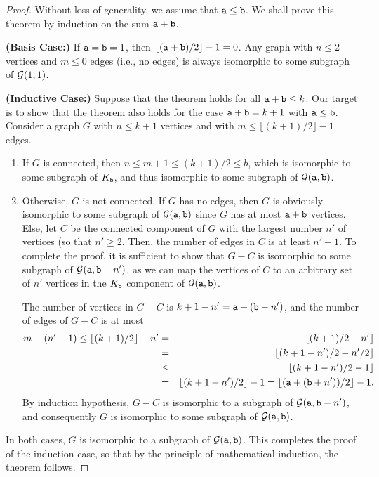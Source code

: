 \begin{proof}
Without loss of generality, we assume that $\mathtt{a} \leq \mathtt{b}$.  We shall prove this theorem by induction on the sum $\mathtt{a} + \mathtt{b}$. 

\medskip

\noindent
{\bf (Basis Case:)} If $\mathtt{a} = \mathtt{b} =1$, then $\lfloor (\mathtt{a}+\mathtt{b})/2 \rfloor-1 = 0$. Any graph with $n \leq 2$ vertices and $m \leq 0$ edges (i.e., no edges) is always isomorphic to some subgraph of ${\cal G}(1,1)$.

\medskip

\noindent
{\bf (Inductive Case:)} Suppose that the theorem holds for all $\mathtt{a} + \mathtt{b} \leq k$.  Our target is to show that the theorem also holds for the case $\mathtt{a} + \mathtt{b} = k + 1$ with $\mathtt{a} \leq \mathtt{b}$.   Consider a graph $G$ with  $n \leq k+1$ vertices and with $m \leq \lfloor (k+1)/2 \rfloor -1$ edges. 

\begin{enumerate}
  \item If $G$ is connected, then $n \leq m + 1 \leq (k+1)/2 \leq b$, which is isomorphic to some subgraph of $K_{\mathtt{b}}$, 
           and thus isomorphic to some subgraph of ${\cal G}(\mathtt{a},\mathtt{b})$.   

  \item Otherwise, $G$ is not connected.  
           If $G$ has no edges, then $G$ is obviously isomorphic to some subgraph of ${\cal G}(\mathtt{a},\mathtt{b})$ 
           since $G$ has at most $\mathtt{a}+\mathtt{b}$ vertices.
           Else, let $C$ be the connected component of $G$ with the largest number $n'$ of vertices (so that $n' \geq 2$.
          Then, the number of edges in $C$ is at least $n'-1$.  To complete the proof, it is sufficient to show 
          that $G - C$ is isomorphic to some subgraph of ${\cal G}(\mathtt{a}, \mathtt{b} - n')$, 
         as we can map the vertices of $C$ to an arbitrary set of $n'$ vertices in the $K_{\mathtt{b}}$ component of ${\cal G}(\mathtt{a},\mathtt{b})$.

The number of vertices in $G-C$ is $k+1-n' = \mathtt{a} + (\mathtt{b}-n')$, and the number of edges of $G-C$ is at most 
\begin{eqnarray*}
m - (n'-1) \leq \lfloor(k+1)/2\rfloor - n' &=& \lfloor(k+1)/2 - n'\rfloor \\
&=& \lfloor (k+1-n')/2 - n'/2 \rfloor \\
&\leq& \lfloor (k+1-n')/2 - 1 \rfloor \\
&=& \lfloor(k+1-n')/2\rfloor - 1 = \lfloor (\mathtt{a} + (\mathtt{b}+n'))/2 \rfloor - 1.
\end{eqnarray*}
By induction hypothesis, $G-C$ is isomorphic to a subgraph of ${\cal G}(\mathtt{a}, \mathtt{b}-n')$, 
and consequently $G$ is isomorphic to some subgraph of ${\cal G}(\mathtt{a},\mathtt{b})$.
\end{enumerate}
In both cases, $G$ is isomorphic to a subgraph of ${\cal G}(\mathtt{a},\mathtt{b})$.  
This completes the proof of the induction case, so that by the principle of mathematical induction, the theorem follows.
\end{proof}

